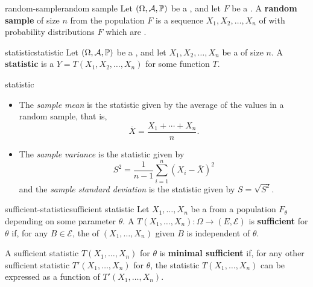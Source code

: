 \begin{topic}{random-sample}{random sample}
    Let $(\Omega, \mathcal{A}, \mathbb{P})$ be a , and let $F$ be a . A \textbf{random sample} of size $n$ from the population $F$ is a sequence $X_1, X_2, \ldots, X_n$ of  with probability distributions $F$ which are .
\end{topic}

\begin{topic}{statistic}{statistic}
    Let $(\Omega, \mathcal{A}, \mathbb{P})$ be a , and let $X_1, X_2, \ldots, X_n$ be a  of size $n$. A \textbf{statistic} is a  $Y = T(X_1, X_2, \ldots, X_n)$ for some function $T$.
\end{topic}

\begin{example}{statistic}
    \begin{itemize}
        \item The \textit{sample mean} is the statistic given by the average of the values in a random sample, that is,
        \[ \overline{X} = \frac{X_1 + \cdots + X_n}{n} . \]
        \item The \textit{sample variance} is the statistic given by
        \[ S^2 = \frac{1}{n - 1} \sum_{i = 1}^{n} (X_i - \overline{X})^2 \]
        and the \textit{sample standard deviation} is the statistic given by $S = \sqrt{S^2}$.
    \end{itemize}
\end{example}

\begin{topic}{sufficient-statistic}{sufficient statistic}
    Let $X_1, \ldots, X_n$ be a  from a population $F_\theta$ depending on some parameter $\theta$. A  $T(X_1, \ldots, X_n) \colon \Omega \to (E, \mathcal{E})$ is \textbf{sufficient} for $\theta$ if, for any $B \in \mathcal{E}$, the  of $(X_1, \ldots, X_n)$ given $B$ is independent of $\theta$.

    A sufficient statistic $T(X_1, \ldots, X_n)$ for $\theta$ is \textbf{minimal sufficient} if, for any other sufficient statistic $T'(X_1, \ldots, X_n)$ for $\theta$, the statistic $T(X_1, \ldots, X_n)$ can be expressed as a function of $T'(X_1, \ldots, X_n)$.
\end{topic}

